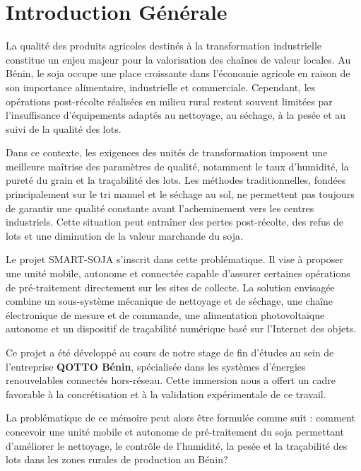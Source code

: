 \chapter*{Introduction Générale}

La qualité des produits agricoles destinés à la transformation industrielle constitue un enjeu majeur pour la valorisation des chaînes de valeur locales. Au Bénin, le soja occupe une place croissante dans l’économie agricole en raison de son importance alimentaire, industrielle et commerciale. Cependant, les opérations post-récolte réalisées en milieu rural restent souvent limitées par l’insuffisance d’équipements adaptés au nettoyage, au séchage, à la pesée et au suivi de la qualité des lots.

Dans ce contexte, les exigences des unités de transformation imposent une meilleure maîtrise des paramètres de qualité, notamment le taux d’humidité, la pureté du grain et la traçabilité des lots. Les méthodes traditionnelles, fondées principalement sur le tri manuel et le séchage au sol, ne permettent pas toujours de garantir une qualité constante avant l’acheminement vers les centres industriels. Cette situation peut entraîner des pertes post-récolte, des refus de lots et une diminution de la valeur marchande du soja.

Le projet SMART-SOJA s’inscrit dans cette problématique. Il vise à proposer une unité mobile, autonome et connectée capable d’assurer certaines opérations de pré-traitement directement sur les sites de collecte. La solution envisagée combine un sous-système mécanique de nettoyage et de séchage, une chaîne électronique de mesure et de commande, une alimentation photovoltaïque autonome et un dispositif de traçabilité numérique basé sur l’Internet des objets.

Ce projet a été développé au cours de notre stage de fin d'études au sein de l'entreprise \textbf{QOTTO Bénin}, spécialisée dans les systèmes d'énergies renouvelables connectés hors-réseau. Cette immersion nous a offert un cadre favorable à la concrétisation et à la validation expérimentale de ce travail.

La problématique de ce mémoire peut alors être formulée comme suit : comment concevoir une unité mobile et autonome de pré-traitement du soja permettant d’améliorer le nettoyage, le contrôle de l’humidité, la pesée et la traçabilité des lots dans les zones rurales de production au Bénin?

